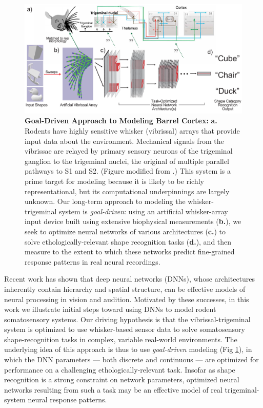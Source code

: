 \begin{figure}
\centering
\includegraphics[width=.85\linewidth]{figures/schematic.pdf}
\vspace{-3mm}
\caption{\footnotesize{\textbf{Goal-Driven Approach to Modeling Barrel Cortex:} \textbf{a.} Rodents have highly sensitive whisker (vibrissal) arrays that provide input data about the environment. Mechanical signals from the vibrissae are relayed by primary sensory neurons of the trigeminal ganglion to the trigeminal nuclei, the original of multiple parallel pathways to S1 and S2. (Figure modified from \cite{deschenes2009vibrissal}.) This system is a prime target for modeling because it is likely to be richly representational, but its computational underpinnings are largely unknown. Our long-term approach to modeling the whisker-trigeminal system is \emph{goal-driven}: using an artificial whisker-array input device built using extensive biophysical measurements (\textbf{b.}), we seek to optimize neural networks of various architectures (\textbf{c.}) to solve ethologically-relevant shape recognition tasks (\textbf{d.}), and then measure to the extent to which these networks predict fine-grained response patterns in real neural recordings.} ~\label{fig_schematic}}
\vspace{-5mm}
\end{figure}

Recent work has shown that deep neural networks (DNNs), whose architectures inherently contain hierarchy and spatial structure, can be effective models of neural processing in vision\cite{Yamins2014,khaligh2014deep} and audition\cite{kell_yamins_sfn}.
Motivated by these successes, in this work we illustrate initial steps toward using DNNs to model rodent somatosensory systems.
Our driving hypothesis is that the vibrissal-trigeminal system is optimized to use whisker-based sensor data to solve somatosensory shape-recognition tasks in complex, variable real-world environments.
The underlying idea of this approach is thus to use \emph{goal-driven} modeling (Fig \ref{fig_schematic}), in which the DNN parameters --- both discrete and continuous --- are optimized for performance on a challenging ethologically-relevant task\cite{yamins2016using}.
Insofar as shape recognition is a strong constraint on network parameters, optimized neural networks resulting from such a task may be an effective model of real trigeminal-system neural response patterns.

